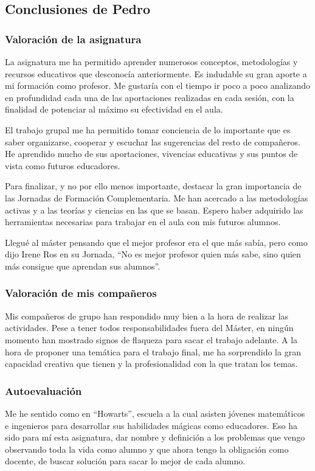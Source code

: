 \subsection{Conclusiones de Pedro}
\begin{leftbar}{\pedrocolor}

\subsubsection{Valoración de la asignatura}

La asignatura me ha permitido aprender numerosos conceptos, metodologías y recursos educativos que desconocía anteriormente. Es indudable su gran aporte a mi formación como profesor. Me gustaría con el tiempo ir poco a poco analizando en profundidad cada una de las aportaciones realizadas en cada sesión, con la finalidad de potenciar al máximo su efectividad en el aula. 

El trabajo grupal me ha permitido tomar conciencia de lo importante que es saber organizarse, cooperar y escuchar las sugerencias del resto de compañeros. He aprendido mucho de sus aportaciones, vivencias educativas y sus puntos de vista como futuros educadores.

Para finalizar, y no por ello menos importante, destacar la gran importancia de las Jornadas de Formación Complementaria. Me han acercado a las metodologías activas y a las teorías y ciencias en las que se basan. Espero haber adquirido las herramientas necesarias para trabajar en el aula con mis futuros alumnos. 

Llegué al máster pensando que el mejor profesor era el que más sabía, pero como dijo Irene Ros en su Jornada, “No es mejor profesor quien más sabe, sino quien más consigue que aprendan sus alumnos”.

\subsubsection{Valoración de mis compañeros}

Mis compañeros de grupo han respondido muy bien a la hora de realizar las actividades. Pese a tener todos responsabilidades fuera del Máster, en ningún momento han mostrado signos de flaqueza para sacar el trabajo adelante. A la hora de proponer una temática para el trabajo final, me ha sorprendido la gran capacidad creativa que tienen y la profesionalidad con la que tratan los temas.

\subsubsection{Autoevaluación}

Me he sentido como en “Howarts”, escuela a la cual asisten jóvenes matemáticos e ingenieros para desarrollar sus habilidades mágicas como educadores.  Eso ha sido para mí esta asignatura, dar nombre y definición a los problemas que vengo observando toda la vida como alumno y que ahora tengo la obligación como docente, de buscar solución para sacar lo mejor de cada alumno. 

\end{leftbar}

